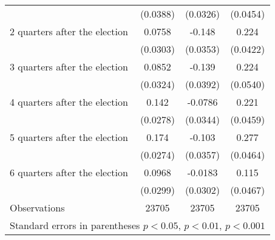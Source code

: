 \begin{table}[!ht]
\begin{tabular}{l*{3}{c}}
                    &    (0.0388)         &    (0.0326)         &    (0.0454)         \\
[0,5em]
 2 quarters after the election&      0.0758\sym{*}  &      -0.148\sym{***}&       0.224\sym{***}\\
                    &    (0.0303)         &    (0.0353)         &    (0.0422)         \\
[0,5em]
 3 quarters after the election&      0.0852\sym{**} &      -0.139\sym{***}&       0.224\sym{***}\\
                    &    (0.0324)         &    (0.0392)         &    (0.0540)         \\
[0,5em]
 4 quarters after the election&       0.142\sym{***}&     -0.0786\sym{*}  &       0.221\sym{***}\\
                    &    (0.0278)         &    (0.0344)         &    (0.0459)         \\
[0,5em]
 5 quarters after the election&       0.174\sym{***}&      -0.103\sym{**} &       0.277\sym{***}\\
                    &    (0.0274)         &    (0.0357)         &    (0.0464)         \\
[0,5em]
 6 quarters after the election&      0.0968\sym{**} &     -0.0183         &       0.115\sym{*}  \\
                    &    (0.0299)         &    (0.0302)         &    (0.0467)         \\
\hline
Observations        &       23705         &       23705         &       23705         \\
\hline\hline
\multicolumn{4}{l}{\scriptsize Standard errors in parentheses  \sym{*} \(p<0.05\), \sym{**} \(p<0.01\), \sym{***} \(p<0.001\)}\\
\end{tabular}
\label{app_graph2_coef}
\end{table}
